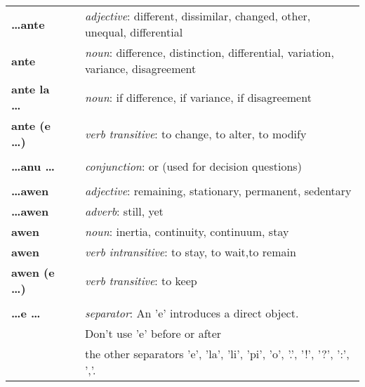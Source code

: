 \begin{supertabular}{p{2,5cm}|ll}
    \textbf{\dots ante}          &  & \textit{adjective}: different, dissimilar, changed, other, unequal, differential                           \\
    \textbf{ante}                &  & \textit{noun}: difference, distinction, differential, variation, variance, disagreement                    \\
    \textbf{ante la \dots}       &  & \textit{noun}: if difference, if variance, if disagreement                                                 \\
    \textbf{ante (e \dots)}      &  & \textit{verb transitive}: to change, to alter, to modify                                                   \\
                                 &  &                                                                                                            \\ %
    \textbf{\dots anu \dots}     &  & \textit{conjunction}: or (used for decision questions)                                                     \\
                                 &  &                                                                                                            \\ %
    \textbf{\dots awen}          &  & \textit{adjective}: remaining, stationary, permanent, sedentary                                            \\
    \textbf{\dots awen}          &  & \textit{adverb}: still, yet                                                                                \\
    \textbf{awen}                &  & \textit{noun}: inertia, continuity, continuum, stay                                                        \\
    \textbf{awen}                &  & \textit{verb intransitive}: to stay, to wait,to remain                                                     \\
    \textbf{awen (e \dots)}      &  & \textit{verb transitive}: to keep                                                                          \\
                                 &  &                                                                                                            \\ %
    \textbf{\dots e \dots}       &  & \textit{separator}: An 'e' introduces a direct object.                                                     \\ && Don't use 'e' before or after \\ && the other separators 'e', 'la', 'li', 'pi', 'o', '.', '!', '?', ':', ','.  \\

\end{supertabular}
